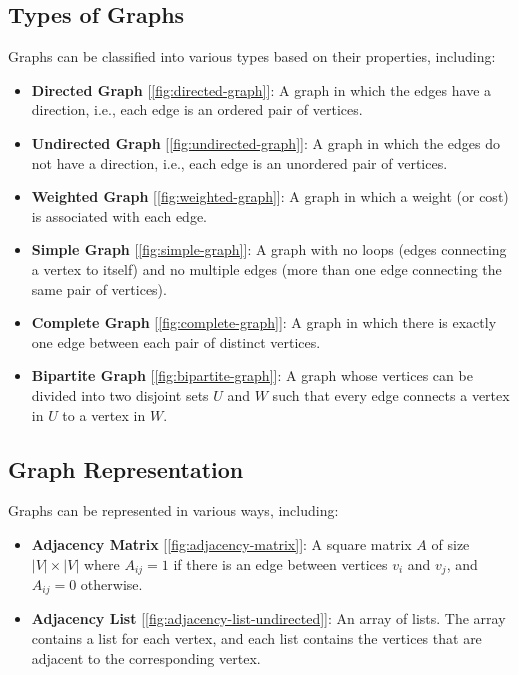 \documentclass[../Thesis.tex]{subfiles}
\begin{document}
\subsection{Types of Graphs}
Graphs can be classified into various types based on their properties, including:
\begin{itemize}
    \item \textbf{Directed Graph} [\autoref{fig:directed-graph}]: A graph in which the edges have a direction, i.e., each edge is an ordered pair of vertices.
    
    \item \textbf{Undirected Graph} [\autoref{fig:undirected-graph}]: A graph in which the edges do not have a direction, i.e., each edge is an unordered pair of vertices.
    
    
    \item \textbf{Weighted Graph} [\autoref{fig:weighted-graph}]: A graph in which a weight (or cost) is associated with each edge.
    
    
    \item \textbf{Simple Graph} [\autoref{fig:simple-graph}]: A graph with no loops (edges connecting a vertex to itself) and no multiple edges (more than one edge connecting the same pair of vertices).
    
    
    \item \textbf{Complete Graph} [\autoref{fig:complete-graph}]: A graph in which there is exactly one edge between each pair of distinct vertices.
    

    \item \textbf{Bipartite Graph} [\autoref{fig:bipartite-graph}]: A graph whose vertices can be divided into two disjoint sets $U$ and $W$ such that every edge connects a vertex in $U$ to a vertex in $W$.
    
\end{itemize}

\subsection{Graph Representation}
Graphs can be represented in various ways, including:
\begin{itemize}
    \item \textbf{Adjacency Matrix} [\autoref{fig:adjacency-matrix}]: A square matrix $A$ of size $|V| \times |V|$ where $A_{ij} = 1$ if there is an edge between vertices $v_i$ and $v_j$, and $A_{ij} = 0$ otherwise.
    
    
    \item \textbf{Adjacency List} [\autoref{fig:adjacency-list-undirected}]: An array of lists. The array contains a list for each vertex, and each list contains the vertices that are adjacent to the corresponding vertex.
    
\end{itemize}
\end{document}
